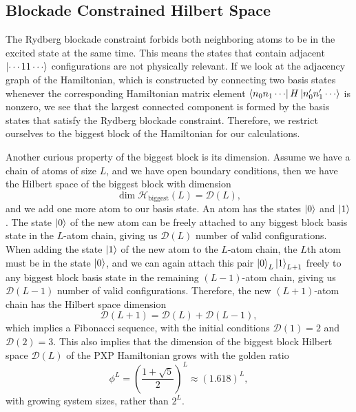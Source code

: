 \documentclass[%
 reprint,
 amsmath,amssymb,
 aps,
]{revtex4-2}
\begin{document}
\subsection{Blockade Constrained Hilbert Space}

The Rydberg blockade constraint forbids both neighboring atoms to be in the excited state at the same time. This means the states that contain adjacent $\ket{\cdots 11\cdots}$ configurations are not physically relevant. If we look at the adjacency graph of the Hamiltonian, which is constructed by connecting two basis states whenever the corresponding Hamiltonian matrix element $\bra{n_0n_1\cdots}H\ket{n_0'n_1'\cdots}$ is nonzero, we see that the largest connected component is formed by the basis states that satisfy the Rydberg blockade constraint. Therefore, we restrict ourselves to the biggest block of the Hamiltonian for our calculations.

Another curious property of the biggest block is its dimension. Assume we have a chain of atoms of size $L$, and we have open boundary conditions, then we have the Hilbert space of the biggest block with dimension
\begin{equation}
    \operatorname{dim}\mathcal{H}_\text{biggest}(L)=\mathcal{D}(L), 
\end{equation}
and we add one more atom to our basis state. An atom has the states $\ket{0}$ and $\ket{1}$. The state $\ket{0}$ of the new atom can be freely attached to any biggest block basis state in the $L$-atom chain, giving us $\mathcal{D}(L)$ number of valid configurations. When adding the state $\ket{1}$ of the new atom to the $L$-atom chain, the $L$th atom must be in the state $\ket{0}$, and we can again attach this pair $\ket{0}_L\ket{1}_{L+1}$ freely to any biggest block basis state in the remaining $(L-1)$-atom chain, giving us $\mathcal{D}(L-1)$ number of valid configurations. Therefore, the new $(L+1)$-atom chain has the Hilbert space dimension
\begin{equation}
    \mathcal{D}(L+1) = \mathcal{D}(L)+\mathcal{D}(L-1),
\end{equation}
which implies a Fibonacci sequence, with the initial conditions $\mathcal{D}(1)=2$ and $\mathcal{D}(2) = 3$. This also implies that the dimension of the biggest block Hilbert space $\mathcal{D}(L)$ of the PXP Hamiltonian grows with the golden ratio 
\[
\phi^L = \left(\frac{1+\sqrt{5}}{2}\right)^L \approx (1.618)^L,
\]
with growing system sizes, rather than $2^L$.
\end{document}
